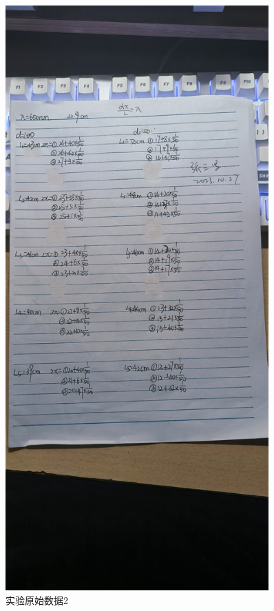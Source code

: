 \documentclass{ctexart}
\begin{document}
\begin{figure}[H]
  \centering
  \includegraphics[width=0.9\textwidth,height=0.8\textheight]{yuanshishujv2.jpg}
  \caption{实验原始数据2}
\end{figure}
\newpage
\end{document}
